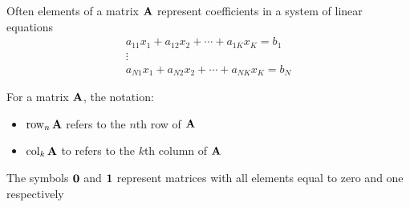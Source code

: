 \begin{frame}

    \vspace{2em}
    Often  elements of a matrix $\mathbf A$ represent coefficients in a system of linear
    equations
    \begin{equation*}
        \label{eq:sleq}
        \begin{array}{c}
            a_{11} x_1 + a_{12} x_2 + \cdots + a_{1K} x_K = b_1 \\
            \vdots  \\
            a_{N1} x_1 + a_{N2} x_2 + \cdots + a_{NK} x_K = b_N 
        \end{array}
    \end{equation*}
    
\end{frame}

\begin{frame}

    \vspace{2em}
    For a matrix $\mathbf A$, the notation:
    \begin{itemize}
        \item $\operatorname{row}_n \mathbf A$ refers to the
    $n$th row of $\mathbf A$
        \item $\operatorname{col}_k \mathbf A$ to refers to the $k$th column of $\mathbf A$
    \end{itemize} 
    
    \vspace{.7em}
    The symbols ${\mathbf 0}$ and ${\mathbf 1}$ represent matrices with all elements equal to zero and one respectively
    
\end{frame}

